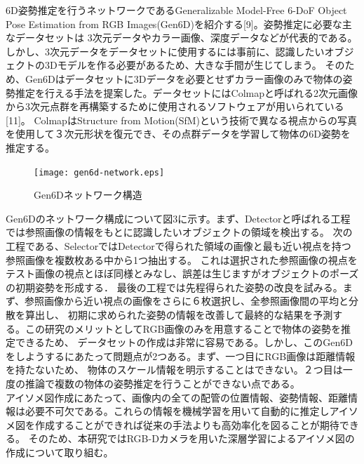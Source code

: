 6D姿勢推定を行うネットワークであるGeneralizable Model-Free 6-DoF Object Pose Estimation from RGB Images(Gen6D)を紹介する[9]。姿勢推定に必要な主なデータセットは
3次元データやカラー画像、深度データなどが代表的である。しかし、3次元データをデータセットに使用するには事前に、認識したいオブジェクトの3Dモデルを作る必要があるため、大きな手間が生じてしまう。
そのため、Gen6Dはデータセットに3Dデータを必要とせずカラー画像のみで物体の姿勢推定を行える手法を提案した。データセットにはColmapと呼ばれる2次元画像から3次元点群を再構築するために使用されるソフトウェアが用いられている[11]。
ColmapはStructure from Motion(SfM)という技術で異なる視点からの写真を使用して３次元形状を復元でき、その点群データを学習して物体の6D姿勢を推定する。\\
\begin{figure}[htbt]
	\centering
	 \texttt{[image: gen6d-network.eps]}
	 \caption{Gen6Dネットワーク構造}
	 \label{fig:f2}
\end{figure}

Gen6Dのネットワーク構成について図3に示す。まず、Detectorと呼ばれる工程では参照画像の情報をもとに認識したいオブジェクトの領域を検出する。
次の工程である、SelectorではDetectorで得られた領域の画像と最も近い視点を持つ参照画像を複数枚ある中から1つ抽出する。
これは選択された参照画像の視点をテスト画像の視点とほぼ同様とみなし、誤差は生じますがオブジェクトのポーズの初期姿勢を形成する．
最後の工程では先程得られた姿勢の改良を試みる。まず、参照画像から近い視点の画像をさらに６枚選択し、全参照画像間の平均と分散を算出し、
初期に求められた姿勢の情報を改善して最終的な結果を予測する。この研究のメリットとしてRGB画像のみを用意することで物体の姿勢を推定できるため、
データセットの作成は非常に容易である。しかし、このGen6Dをしようするにあたって問題点が2つある。まず、一つ目にRGB画像は距離情報を持たないため、
物体のスケール情報を明示することはできない。２つ目は一度の推論で複数の物体の姿勢推定を行うことができない点である。\\

アイソメ図作成にあたって、画像内の全ての配管の位置情報、姿勢情報、距離情報は必要不可欠である。これらの情報を機械学習を用いて自動的に推定しアイソメ図を作成することができれば従来の手法よりも高効率化を図ることが期待できる。
そのため、本研究ではRGB-Dカメラを用いた深層学習によるアイソメ図の作成について取り組む。






